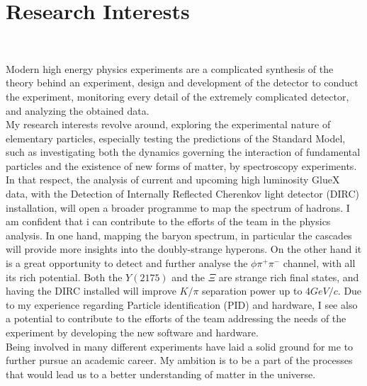\documentclass[a4paper,roman]{article}
\begin{document}
\section*{Research Interests}
~\par Modern high energy physics experiments are a complicated synthesis of the theory behind an experiment, design and development of the detector to conduct the experiment, monitoring every detail of the extremely complicated detector, and analyzing the obtained data.\\
My research interests revolve around, exploring the experimental nature of elementary particles, especially testing the predictions of the Standard Model, such as investigating both the dynamics governing the interaction of fundamental particles and the existence of new forms of matter, by spectroscopy experiments.\\
In that respect, the analysis of current and upcoming high luminosity GlueX data, with the Detection of Internally Reflected Cherenkov light detector (DIRC) installation, will open a broader programme to map the spectrum of hadrons. I am confident that i can contribute to the efforts of the team in the physics analysis. In one hand, mapping the baryon spectrum, in particular the cascades will provide more insights into the doubly-strange hyperons. On the other hand it is a great opportunity to detect and further analyse the $\phi\pi^{+}\pi^{-}$ channel, with all its rich potential. Both the $Y(2175)$ and the $\Xi$ are strange rich final states, and having the DIRC installed will improve $K/\pi$ separation power up to $4 GeV/c$. Due to my experience regarding Particle identification (PID) and hardware, I see also a potential to contribute to the efforts of the team addressing the needs of the experiment by developing the new software and hardware.\\
Being involved in many different experiments have laid a solid ground for me to further pursue an academic career. My ambition is to be a part of the processes that would lead us to a better understanding of matter in the universe.
\end{document}
